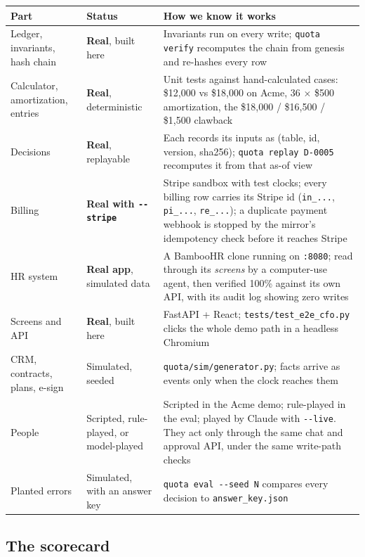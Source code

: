 \documentclass[10pt,a4paper]{article}
\newcommand{\gy}[1]{{\color{qgrey}#1}}
\newcommand{\code}[1]{{\small\texttt{#1}}}
\begin{document}
\renewcommand{\arraystretch}{1.2}
\begin{tabularx}{\textwidth}{@{}p{38mm}p{24mm}X@{}}
\toprule
\textbf{Part} & \textbf{Status} & \textbf{How we know it works}\\
\midrule
Ledger, invariants, hash chain & \textbf{Real}, built here & Invariants run on every write; \code{quota verify} recomputes the chain from genesis and re-hashes every row\\
Calculator, amortization, entries & \textbf{Real}, deterministic & Unit tests against hand-calculated cases: \$12{,}000 vs \$18{,}000 on Acme, 36 $\times$ \$500 amortization, the \$18{,}000 / \$16{,}500 / \$1{,}500 clawback\\
Decisions & \textbf{Real}, replayable & Each records its inputs as \gy{(table, id, version, sha256)}; \code{quota replay D-0005} recomputes it from that as-of view\\
Billing & \textbf{Real with \code{-{}-stripe}} & Stripe sandbox with test clocks; every billing row carries its Stripe id \gy{(\code{in\_...}, \code{pi\_...}, \code{re\_...})}; a duplicate payment webhook is stopped by the mirror's idempotency check before it reaches Stripe\\
HR system & \textbf{Real app}, simulated data & A BambooHR clone running on \code{:8080}; read through its \emph{screens} by a computer-use agent, then verified 100\% against its own API, with its audit log showing zero writes\\
Screens and API & \textbf{Real}, built here & FastAPI + React; \code{tests/test\_e2e\_cfo.py} clicks the whole demo path in a headless Chromium\\
\midrule
CRM, contracts, plans, e-sign & \gy{Simulated, seeded} & \code{quota/sim/generator.py}; facts arrive as events only when the clock reaches them\\
People & \gy{Scripted, rule-played, or model-played} & Scripted in the Acme demo; rule-played in the eval; played by Claude with \code{-{}-live}. They act only through the same chat and approval API, under the same write-path checks\\
Planted errors & \gy{Simulated, with an answer key} & \code{quota eval -{}-seed N} compares every decision to \code{answer\_key.json}\\
\bottomrule
\end{tabularx}

\subsection{The scorecard}
\end{document}
